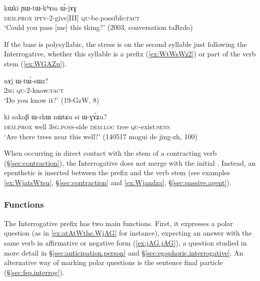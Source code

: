 \begin{exe}
\ex \label{ex:YWtWkhAm.WjAG}
 \gll kɯki ɲɯ-tɯ-kʰɤm ɯ́-jɤɣ \\
 \textsc{dem}.\textsc{prox} \textsc{ipfv}-2-give[III] \textsc{qu}-be.possible:\textsc{fact} \\
\glt `Could you pass [me] this thing?' (2003, conversation taRrdo)
\end{exe}

If the base is polysyllabic, the stress is on the second syllable just following the Interrogative, whether this syllable is a prefix (\ref{ex:WtWsWz2}) or part of the verb stem (\ref{ex:WGAZu}).

\begin{exe}
\ex \label{ex:WtWsWz2}
 \gll nɤj ɯ-tɯ́-sɯz? \\
\textsc{2sg} \textsc{qu}-2-know:\textsc{fact} \\
\glt `Do you know it?' (19-GzW, 8)
\end{exe}

\begin{exe}
\ex \label{ex:WGAZu}
 \gll ki sakaβ ɯ-rkɯ nɯtɕu si ɯ-ɣɤ́ʑu? \\
 \textsc{dem}.\textsc{prox} well \textsc{3sg}.\textsc{poss}-side \textsc{dem}:\textsc{loc} tree \textsc{qu}-exist:\textsc{sens} \\
 \glt `Are there trees near this well?' (140517 mogui de jing-zh, 100)
\end{exe}

When occurring in direct contact with the stem of a contracting verb (§\ref{sec:contraction}), the Interrogative  does not merge with the initial . Instead, an epenthetic  is inserted between the prefix and the verb stem (see examples \ref{ex:WjatsWtsu},  §\ref{sec:contraction} and \ref{ex:Wjandza}, §\ref{sec:passive.agent}).



 \subsubsection{Functions} \label{sec:interrogative.W.function}
The Interrogative prefix  has two main functions.  First, it expresses a polar question (as in \ref{ex:atAtWthe.WjAG} for instance), expecting an answer with the same verb in affirmative or negative form (\ref{ex:jAG.jAG}), a question studied in more detail in §\ref{sec:anticipation.person} and §\ref{sec:egophoric.interrogative}. An alternative way of marking polar questions is the sentence final particle  (§\ref{sec:fsp.interrog}).


